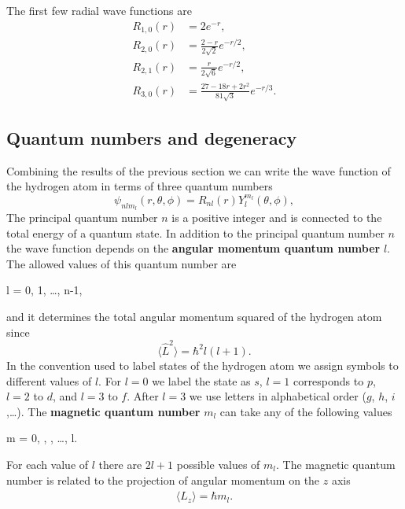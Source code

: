\documentclass[../Main/chem331-notes.tex]{subfiles}
\begin{document}
The first few radial wave functions are
\begin{equation}
\begin{split}
R_{1,0}(r) & = 2 e^{-r}, \\
R_{2,0}(r) & =\frac{2 - r}{2 \sqrt{2}} e^{-r/2}, \\
R_{2,1}(r) & =\frac{r}{2 \sqrt{6}} e^{-r/2}, \\
R_{3,0}(r) & =\frac{27 - 18 r + 2 r^2}{81 \sqrt{3}} e^{-r/3}.
\end{split}
\end{equation}

\subsection{Quantum numbers and degeneracy}
Combining the results of the previous section we can write the wave function of the hydrogen atom in terms of three quantum numbers
\begin{equation}
\psi_{nlm_l}(r,\theta,\phi) = R_{nl}(r) Y_l^{m_l}(\theta,\phi),
\end{equation}
The principal quantum number $n$ is a positive integer and is connected to the total energy of a quantum state. 
In addition to the principal quantum number $n$ the wave function depends on the \textbf{angular momentum quantum number} $l$.  The allowed values of this quantum number are
\begin{iequation}
l = 0, 1, \ldots, n-1,
\end{iequation}
and it determines the total angular momentum squared of the hydrogen atom since
\begin{equation}
\langle \hat{L}^2 \rangle = \hbar^2 l(l + 1).
\end{equation}
In the convention used to label states of the hydrogen atom we assign symbols to different values of $l$. For $l = 0$ we label the state as $s$, $l = 1$ corresponds to $p$, $l= 2$ to $d$, and $l = 3$ to $f$. After $l=3$ we use letters in alphabetical order ($g$, $h$, $i$,\ldots).
The \textbf{magnetic quantum number} $m_l$ can take any of the following values
\begin{iequation}
m = 0, , ,  \ldots, l.
\end{iequation}
For each value of $l$ there are $2l +1$ possible values of $m_l$. 
The magnetic quantum number is related to the projection of angular momentum on the $z$ axis
\begin{equation}
\langle \hat{L}_z \rangle = \hbar m_l.
\end{equation}
\end{document}
